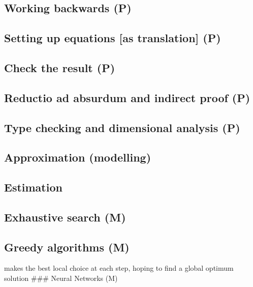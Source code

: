 \documentclass[
  a4paper,
  DIV=11,
  numbers=noendperiod,
  oneside]{scrreprt}
\begin{document}
\subsection{Working backwards (P)}\label{working-backwards-p}

\subsection{Setting up equations {[}as translation{]}
(P)}\label{setting-up-equations-as-translation-p}

\subsection{Check the result (P)}\label{check-the-result-p}

\subsection{Reductio ad absurdum and indirect proof
(P)}\label{reductio-ad-absurdum-and-indirect-proof-p}

\subsection{Type checking and dimensional analysis
(P)}\label{type-checking-and-dimensional-analysis-p}

\subsection{Approximation (modelling)}\label{approximation-modelling}

\subsection{Estimation}\label{estimation}

\subsection{Exhaustive search (M)}\label{exhaustive-search-m}

\subsection{Greedy algorithms (M)}\label{greedy-algorithms-m}

makes the best local choice at each step, hoping to find a global
optimum solution \#\#\# Neural Networks (M)
\end{document}

